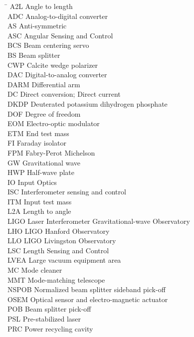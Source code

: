 \begin{tabbing}
\hspace{1in} \= \kill
A2L \> Angle to length \\
ADC \> Analog-to-digital converter \\
AS \> Anti-symmetric \\
ASC \> Angular Sensing and Control \\
BCS \> Beam centering servo \\
BS \> Beam splitter \\
CWP \> Calcite wedge polarizer \\
DAC \> Digital-to-analog converter\\
DARM \> Differential arm \\
DC \> Direct conversion; Direct current \\
DKDP \> Deuterated potassium dihydrogen phosphate \\
DOF \> Degree of freedom \\
EOM \> Electro-optic modulator \\
ETM \> End test mass \\
FI \> Faraday isolator \\
FPM \> Fabry-Perot Michelson \\
GW \> Gravitational wave \\
HWP \> Half-wave plate \\
IO \> Input Optics \\
ISC \> Interferometer sensing and control \\
ITM \> Input test mass \\
L2A \> Length to angle \\
LIGO \> Laser Interferometer Gravitational-wave Observatory \\
LHO \> LIGO Hanford Observatory \\
LLO \> LIGO Livingston Observatory \\
LSC \> Length Sensing and Control \\
LVEA \> Large vacuum equipment area \\
MC \> Mode cleaner \\
MMT \> Mode-matching telescope \\
NSPOB \> Normalized beam splitter sideband pick-off \\
OSEM \> Optical sensor and electro-magnetic actuator \\
POB \> Beam splitter pick-off \\
PSL \> Pre-stabilized laser \\
PRC \> Power recycling cavity \\

\end{tabbing}
